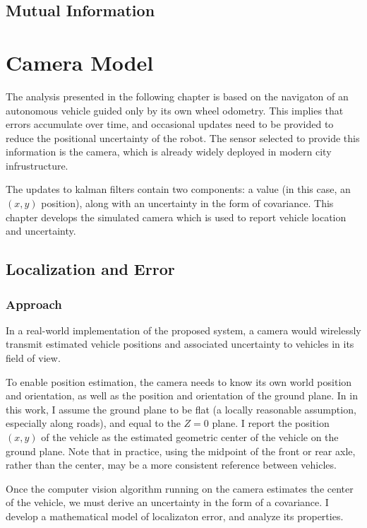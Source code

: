 \documentclass[a4paper,12pt,twoside,openright]{report}
\begin{document}
\section{Mutual Information}



\chapter{Camera Model}
\label{chap:cameramodel}

The analysis presented in the following chapter is based on the navigaton of an
autonomous vehicle guided only by its own wheel odometry. 
This implies that errors accumulate over time, and
occasional updates need to be provided to reduce the positional 
uncertainty of the robot. The sensor selected to provide this
information is the camera, which is already widely deployed
in modern city infrustructure.

The updates to kalman filters contain two components: a value (in this case, an $(x,y)$ position),
along with an uncertainty in the form of covariance. This chapter
develops the simulated camera which is used to report vehicle 
location and uncertainty.
 
\section{Localization and Error}

\subsection{Approach}

In a real-world implementation of the proposed system, a camera would wirelessly
transmit estimated vehicle positions and associated uncertainty to vehicles in its field of view.

To enable position estimation, the camera needs to know its own world position and orientation, 
as well as the position and orientation of the ground plane. In in this work,
I assume the ground plane to be flat (a locally reasonable assumption, especially along roads), 
and equal to the $Z = 0$ plane. I report the position $(x,y)$ of the vehicle
as the estimated geometric center of the vehicle on the ground plane. 
Note that in practice, using the midpoint of the front or rear axle, rather than the center, 
may be a more consistent reference between vehicles.

Once the computer vision algorithm running on the camera estimates the center of the vehicle,
we must derive an uncertainty in the form of a covariance. I develop a mathematical model of localizaton error,
and analyze its properties. 
\end{document}
